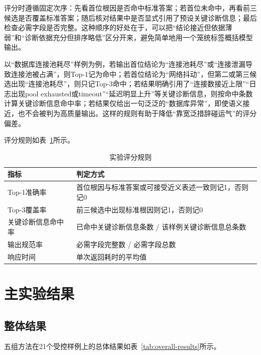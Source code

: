 评分时遵循固定次序：先看首位根因是否命中标准答案；若首位未命中，再看前三候选是否覆盖标准答案；随后核对结果中是否显式引用了预设关键诊断信息；最后检查必需字段是否完整。这种顺序的好处在于，可以把“结论接近但依据薄弱”和“诊断依据充分但排序略低”区分开来，避免简单地用一个笼统标签概括模型输出。

以“数据库连接池耗尽”样例为例，若输出首位结论为“连接池耗尽”或“连接泄漏导致连接池被占满”，则Top-1记为命中；若首位结论为“网络抖动”，但第二或第三候选出现“连接池耗尽”，则只记Top-3命中；若结果明确引用了“连接数接近上限”“日志出现pool exhausted或timeout”“延迟明显上升”等关键诊断信息，则按命中条数计算关键诊断信息命中率；若结果仅给出一句泛泛的“数据库异常”，即使语义接近，也不会被判为高质量输出。这样的规则有助于降低“靠宽泛措辞碰运气”的评分偏差。

评分规则如表~\ref{tab:rubric}所示。

\begin{table}[htbp]
\centering
\caption{实验评分规则}
\label{tab:rubric}
\small
\setlength{\tabcolsep}{4pt}
\renewcommand{\arraystretch}{1.12}
\begin{tabular}{p{2.9cm}p{8.0cm}}
\toprule
指标 & 判定方式 \\
\midrule
Top-1准确率 & 首位根因与标准答案或可接受近义表述一致则记1，否则记0 \\
Top-3覆盖率 & 前三候选中出现标准根因则记1，否则记0 \\
关键诊断信息命中率 & 已命中关键诊断信息条数 / 该样例关键诊断信息总条数 \\
输出规范率 & 必需字段完整数 / 必需字段总数 \\
响应时间 & 单次返回耗时的平均值 \\
\bottomrule
\end{tabular}
\end{table}

\section{主实验结果}

\subsection{整体结果}

五组方法在21个受控样例上的总体结果如表~\ref{tab:overall-results}所示。

